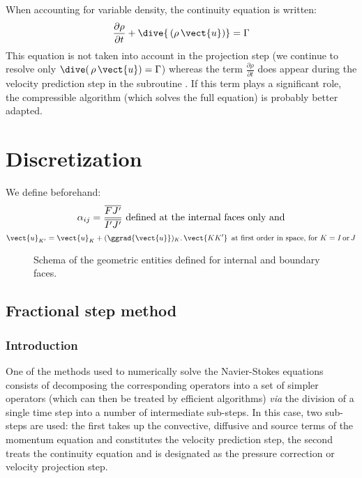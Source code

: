 \begin{remark}
When accounting for variable density, the continuity equation is written:
$$\frac{\partial \rho}{\partial t} + \dive{\,(\rho\,\vect{u})} = \Gamma  $$
This equation is not taken into account in the projection step
(we continue to resolve only $\displaystyle \dive(\,{\rho\,\vect{u}}) = \Gamma$)
whereas the term $\displaystyle \frac{\partial \rho}{\partial t}$ does
appear during the velocity prediction step in the subroutine .
If this term plays a significant role, the \CS compressible algorithm
(which solves the full equation) is probably better adapted.
\end{remark}

\section*{Discretization}

We define beforehand:
%
\begin{equation}\notag
\displaystyle\alpha_{ij}=\frac{\overline{FJ'}}{\overline{I'J'}} \text{\ defined  at the internal faces only and}
\end{equation}
\begin{equation}\notag
\vect{u}_{K'} = \vect{u}_{K}+(\ggrad{\vect{u}})_K\text{.}\, \vect{KK'}\, \text{\
at first order in space, for ${K = I \,\text{or}\, J}$}
\end{equation}

\begin{figure}[!htbc]
\centering
{}%
\caption{\label{fig:internal_boundary_faces_schetches}Schema of the geometric entities defined for
internal and boundary faces.}
\end{figure}

\subsection*{Fractional step method}
\subsubsection*{Introduction}
One of the methods used to numerically solve the Navier-Stokes equations
consists of decomposing the corresponding operators into a set of simpler
operators (which can then be treated by efficient algorithms) \emph{via}
the division of a single time step into a number of intermediate sub-steps.
In this case, two sub-steps are used: the first takes up the convective,
diffusive and source terms of the momentum equation and constitutes the
velocity prediction step, the second treats the continuity equation and
is designated as the pressure correction or velocity projection step.

